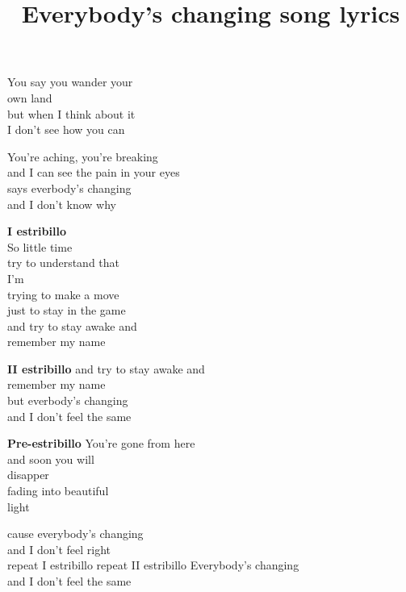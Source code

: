 \documentclass[a4paper,12pt]{article}
\date{\vspace{-9ex}}
\begin{document}
\title{\textbf{Everybody's changing song lyrics}}
\maketitle
    \begin{center}
        You say you wander your \\
        own land \\
        but when I think about it \\
        I don't see how you can
    \end{center}

    \begin{center}
        You're aching, you're breaking\\
        and I can see the pain in your eyes\\
        says everbody's changing\\
        and I don't know why\\
    \end{center}

    \begin{center}
        \textbf{I estribillo}\\
        So little time\\
        try to understand that\\
        I'm\\
        trying to make a move\\
        just to stay in the game\\
        and try to stay awake and\\
        remember my name\\
    \end{center}

    \begin{center}
        \textbf{II estribillo}
        and try to stay awake and\\
        remember my name\\
        but everbody's changing\\
        and I don't feel the same\\
    \end{center}

    \begin{center}
        \textbf{Pre-estribillo}
        You're gone from here\\
        and soon you will\\
        disapper\\
        fading into beautiful\\
        light\\
    \end{center}

    \begin{center} 
        cause everybody's changing\\
        and I don't feel right\\
        repeat I estribillo
        repeat II estribillo
        Everybody's changing\\
        and I don't feel the same
    \end{center}
\end{document}
